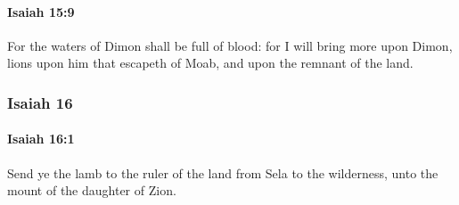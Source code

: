 		\paragraph{Isaiah 15:9} %
			\label{ISAIAH-15-9}

			For the waters of Dimon shall be full of blood: for I will bring more upon Dimon, lions upon him that escapeth of Moab, and upon the remnant of the land.

	\subsubsection{Isaiah 16} %
		\label{ISAIAH-16}

		\paragraph{Isaiah 16:1} %
			\label{ISAIAH-16-1}

			Send ye the lamb to the ruler of the land from Sela to the wilderness, unto the mount of the daughter of Zion.

